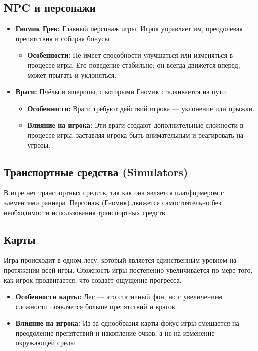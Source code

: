 \documentclass{article}
\begin{document}
\subsection{NPC и персонажи}
\begin{itemize}
    \item \textbf{Гномик Грек:} Главный персонаж игры. Игрок управляет им, преодолевая препятствия и собирая бонусы.
    \begin{itemize}
        \item \textbf{Особенности:} Не имеет способности улучшаться или изменяться в процессе игры. Его поведение стабильно: он всегда движется вперед, может прыгать и уклоняться.
    \end{itemize}
    \item \textbf{Враги:} Пчёлы и ящерицы, с которыми Гномик сталкивается на пути.
    \begin{itemize}
        \item \textbf{Особенности:} Враги требуют действий игрока — уклонение или прыжки.
        \item \textbf{Влияние на игрока:} Эти враги создают дополнительные сложности в процессе игры, заставляя игрока быть внимательным и реагировать на угрозы.
    \end{itemize}
\end{itemize}

\subsection{Транспортные средства (Simulators)}
В игре нет транспортных средств, так как она является платформером с элементами раннера. Персонаж (Гномик) движется самостоятельно без необходимости использования транспортных средств.

\subsection{Карты}
Игра происходит в одном лесу, который является единственным уровнем на протяжении всей игры. Сложность игры постепенно увеличивается по мере того, как игрок продвигается, что создаёт ощущение прогресса.
\begin{itemize}
    \item \textbf{Особенности карты:} Лес — это статичный фон, но с увеличением сложности появляется больше препятствий и врагов.
    \item \textbf{Влияние на игрока:} Из-за однообразия карты фокус игры смещается на преодоление препятствий и накопление очков, а не на изменение окружающей среды.
\end{itemize}
\end{document}
